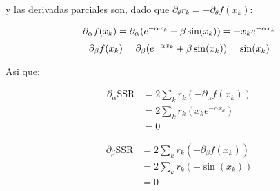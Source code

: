 y las derivadas parciales son, dado que $\partial_\theta r_k = - \partial_\theta f(x_k)$:

\begin{equation}
	\partial_\alpha f(x_k) = \partial_\alpha (e^{-\alpha x_k} + \beta \sin(x_k)) \\ 
	= -x_k e^{-\alpha x_k}
\end{equation}
\begin{equation}
	\partial_\beta f(x_k) = \partial_\beta (e^{-\alpha x_k} + \beta \sin(x_k)) \\ 
	= \sin(x_k)
\end{equation}

Asi que:

\begin{align*}
	\partial_\alpha \text{SSR} &= 
	2 \sum_{k} r_k(-\partial_\alpha f(x_k)) \\
	&= 2 \sum_{k} r_k(x_k e^{-\alpha x_k}) \\
	&= 0
\end{align*}

\begin{align*}
	\partial_\beta \text{SSR} &= 
	2 \sum_{k}r_k(-\partial_\beta f(x_k)) \\
	&= 2 \sum_{k} r_k (-\sin(x_k)) \\
	&= 0
\end{align*}

